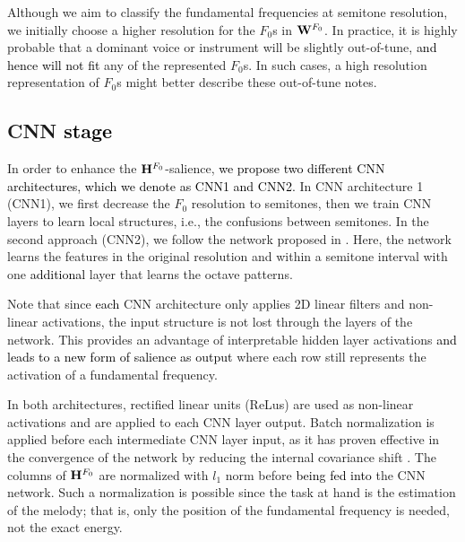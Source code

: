 \documentclass{article}
\newcommand{\gp}[1]{{\textcolor{black}{#1}}}
\newcommand{\gpcor}[2]{{\textcolor{black}{#2}}}
\newcommand{\se}[1]{{\textcolor{black}{#1}}}
\newcommand{\secor}[2]{{\textcolor{black}{#2}}}
\newcommand{\jb}[1]{{\textcolor{black}{#1}}}
\newcommand{\jbcor}[2]{{\textcolor{black}{#2}}}
\begin{document}
Although we aim to classify the fundamental frequencies at semitone resolution, we initially choose a higher resolution for the $F_0$s in  $\mathbf{W}^{F_{0}}$. 
In practice, it is highly probable that a dominant voice or instrument will be slightly out-of-tune, \jb{and hence will not fit}
any of the represented $F_0$s. 
In such cases, a high resolution representation of $F_0$s might better describe these out-of-tune notes. 

\subsection{CNN \secor{Network}{stage}} \label{subsec:CNNstage}
In order to enhance the $\mathbf{H}^{F_{0}}$-salience,
\jb{we propose two different CNN architectures, which we denote as CNN1 and CNN2.}
In
CNN architecture 1 (CNN1), we first decrease the $F_0$ resolution to semitones, then we train CNN layers to learn local structures, i.e., the confusions between semitones. 
In the second approach (CNN2), we follow the network proposed in \cite{bittner2017_deep}. Here, the network learns the features in the original resolution and within a semitone interval with one \jbcor{exceptional}{additional} layer that learns the octave patterns. 

Note that since \jbcor{the}{each} CNN architecture only applies 2D linear filters and non-linear activations, the input structure is not lost through the layers of the network. This provides an advantage of interpretable hidden layer activations \se{and leads to a new form of salience as output} where each row still represents the activation of a fundamental frequency. 

In both architectures, rectified linear units (ReLu\jb{s}) are used as non-linear activations and are applied to each CNN layer output. Batch normalization is applied before each intermediate CNN layer input, as it has proven effective in the convergence of the network by reducing the internal covariance shift \cite{batch_normalization}. The columns of $\mathbf{H}^{F_{0}}$ are normalized with $l_1$ norm before \jbcor{feeding \secor{into}{them}}{being fed into} the CNN network. Such a normalization is possible since the task at hand is the estimation of the melody; that is, only the position of the fundamental frequency is needed, not the exact energy. 
\end{document}
